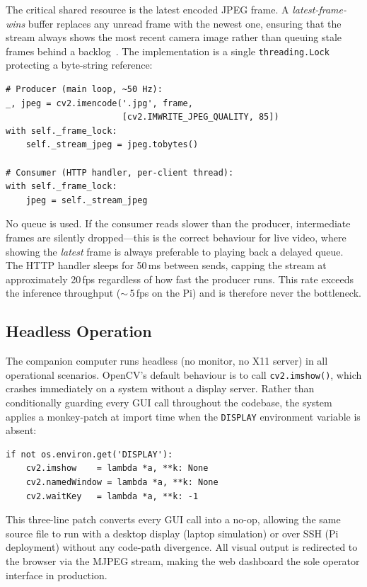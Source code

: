 The critical shared resource is the latest encoded JPEG frame. A \emph{latest-frame-wins}
buffer replaces any unread frame with the newest one, ensuring that the stream always
shows the most recent camera image rather than queuing stale frames behind a
backlog~\cite{gamma1994design}. The implementation is a single \texttt{threading.Lock}
protecting a byte-string reference:

\begin{verbatim}
# Producer (main loop, ~50 Hz):
_, jpeg = cv2.imencode('.jpg', frame,
                       [cv2.IMWRITE_JPEG_QUALITY, 85])
with self._frame_lock:
    self._stream_jpeg = jpeg.tobytes()

# Consumer (HTTP handler, per-client thread):
with self._frame_lock:
    jpeg = self._stream_jpeg
\end{verbatim}

No queue is used. If the consumer reads slower than the producer, intermediate frames are
silently dropped---this is the correct behaviour for live video, where showing the
\emph{latest} frame is always preferable to playing back a delayed queue. The HTTP handler
sleeps for 50\,ms between sends, capping the stream at approximately 20\,fps regardless
of how fast the producer runs. This rate exceeds the inference throughput
(${\sim}$\,5\,fps on the Pi) and is therefore never the bottleneck.

\subsection{Headless Operation}\label{sec:headless-design}

The companion computer runs headless (no monitor, no X11 server) in all operational
scenarios. OpenCV's default behaviour is to call \texttt{cv2.imshow()}, which crashes
immediately on a system without a display server. Rather than conditionally guarding every
GUI call throughout the codebase, the system applies a monkey-patch at import time when
the \texttt{DISPLAY} environment variable is absent:

\begin{verbatim}
if not os.environ.get('DISPLAY'):
    cv2.imshow    = lambda *a, **k: None
    cv2.namedWindow = lambda *a, **k: None
    cv2.waitKey   = lambda *a, **k: -1
\end{verbatim}

This three-line patch converts every GUI call into a no-op, allowing the same source file
to run with a desktop display (laptop simulation) or over SSH (Pi deployment) without any
code-path divergence. All visual output is redirected to the browser via the MJPEG stream,
making the web dashboard the sole operator interface in production.

